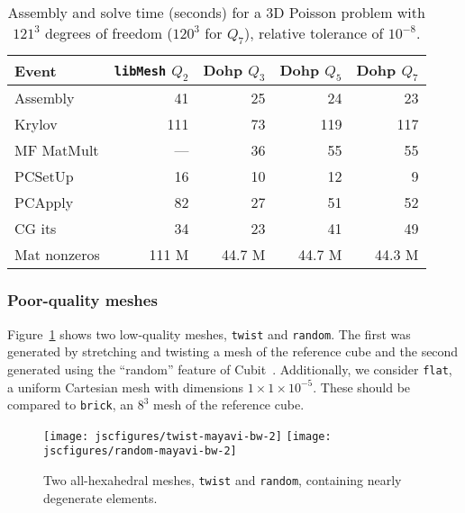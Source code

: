 \begin{table}
  \centering
  \begin{tabular}{l rrrr}
    \toprule
    Event        & \texttt{libMesh} $Q_2$ & Dohp $Q_3$ & Dohp $Q_5$ & Dohp $Q_7$ \\
    \midrule
    Assembly     & 41            & 25         & 24         & 23         \\
    Krylov       & 111           & 73         & 119        & 117        \\
    MF MatMult   & ---           & 36         & 55         & 55         \\
    PCSetUp      & 16            & 10         & 12         & 9          \\
    PCApply      & 82            & 27         & 51         & 52         \\
    \midrule
    CG its       & 34            & 23         & 41         & 49         \\
    Mat nonzeros & 111 M         & 44.7 M     & 44.7 M     & 44.3 M     \\
    \bottomrule
  \end{tabular}
  \caption{Assembly and solve time (seconds) for a 3D Poisson problem with $121^3$ degrees of freedom ($120^3$ for
    $Q_7$), relative tolerance of $10^{-8}$.}\label{tab:libmesh}
\end{table}

\subsubsection{Poor-quality meshes}
Figure~\ref{fig:quality} shows two low-quality meshes, \texttt{twist} and \texttt{random}.  The first was generated by
stretching and twisting a mesh of the reference cube and the second generated using the ``random'' feature of
Cubit~\cite{blacker1994cmg}.  Additionally, we consider \texttt{flat}, a uniform Cartesian mesh with dimensions $1\times
1 \times 10^{-5}$.  These should be compared to \texttt{brick}, an $8^3$ mesh of the reference cube.

\begin{figure}
  \centering
  \texttt{[image: jscfigures/twist-mayavi-bw-2]}
  \texttt{[image: jscfigures/random-mayavi-bw-2]}
  \caption{Two all-hexahedral meshes, \texttt{twist} and \texttt{random}, containing nearly degenerate elements.
    }
  \label{fig:quality}
\end{figure}

